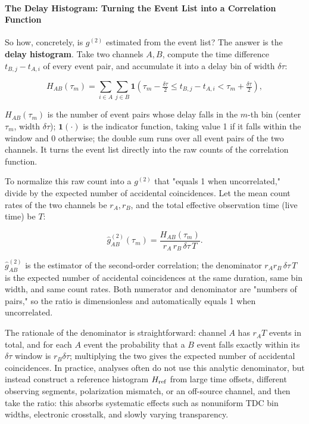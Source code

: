 \paragraph{The Delay Histogram: Turning the Event List into a Correlation Function}
\label{sec:e08-histogram}

So how, concretely, is \(g^{(2)}\) estimated from the event list? The answer is the \textbf{delay histogram}. Take two channels \(A,B\), compute the time difference \(t_{B,j}-t_{A,i}\) of every event pair, and accumulate it into a delay bin of width \(\delta\tau\):

\begin{equation}
  H_{AB}(\tau_m)=\sum_{i\in A}\sum_{j\in B}
  \mathbf{1}\!\left(\tau_m-\tfrac{\delta\tau}{2}\le t_{B,j}-t_{A,i}<\tau_m+\tfrac{\delta\tau}{2}\right),
  \label{eq:e08-histogram}
\end{equation}
\begin{formulaexplain}
\(H_{AB}(\tau_m)\) is the number of event pairs whose delay falls in the \(m\)-th bin (center \(\tau_m\), width \(\delta\tau\)); \(\mathbf 1(\cdot)\) is the indicator function, taking value 1 if it falls within the window and 0 otherwise; the double sum runs over all event pairs of the two channels. It turns the event list directly into the raw counts of the correlation function.
\end{formulaexplain}

To normalize this raw count into a \(g^{(2)}\) that "equals 1 when uncorrelated," divide by the expected number of accidental coincidences. Let the mean count rates of the two channels be \(r_A,r_B\), and the total effective observation time (live time) be \(T\):

\begin{equation}
  \widehat g^{(2)}_{AB}(\tau_m)=\frac{H_{AB}(\tau_m)}{r_A\,r_B\,\delta\tau\,T}.
  \label{eq:e08-estimator}
\end{equation}
\begin{formulaexplain}
\(\widehat g^{(2)}_{AB}\) is the estimator of the second-order correlation; the denominator \(r_Ar_B\,\delta\tau\,T\) is the expected number of accidental coincidences at the same duration, same bin width, and same count rates. Both numerator and denominator are "numbers of pairs," so the ratio is dimensionless and automatically equals 1 when uncorrelated.
\end{formulaexplain}

The rationale of the denominator is straightforward: channel \(A\) has \(r_AT\) events in total, and for each \(A\) event the probability that a \(B\) event falls exactly within its \(\delta\tau\) window is \(r_B\delta\tau\); multiplying the two gives the expected number of accidental coincidences. In practice, analyses often do not use this analytic denominator, but instead construct a reference histogram \(H_{\rm ref}\) from large time offsets, different observing segments, polarization mismatch, or an off-source channel, and then take the ratio: this absorbs systematic effects such as nonuniform TDC bin widths, electronic crosstalk, and slowly varying transparency.

